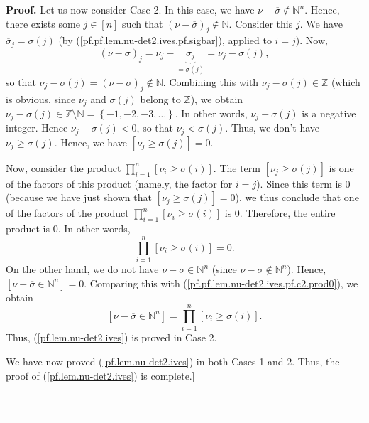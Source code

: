 \documentclass
[numbers=enddot,12pt,final,onecolumn,notitlepage,english]{scrartcl}%
\theoremstyle{definition}
\newenvironment{proof}[1][Proof]{\noindent\textbf{#1.} }{\ \rule{0.5em}{0.5em}}
\let\prodnonlimits\prod
\renewcommand{\prod}{\prodnonlimits\limits}
\newenvironment{verlong}{}{}
\begin{document}
\begin{verlong}
\begin{proof}
Let us now consider Case 2. In this case, we have $\nu-\overline{\sigma}%
\notin\mathbb{N}^{n}$. Hence, there exists some $j\in\left[  n\right]  $ such
that $\left(  \nu-\overline{\sigma}\right)  _{j}\notin\mathbb{N}$. Consider
this $j$. We have $\overline{\sigma}_{j}=\sigma\left(  j\right)  $ (by
(\ref{pf.pf.lem.nu-det2.ives.pf.sigbar}), applied to $i=j$). Now,
\[
\left(  \nu-\overline{\sigma}\right)  _{j}=\nu_{j}-\underbrace{\overline
{\sigma}_{j}}_{=\sigma\left(  j\right)  }=\nu_{j}-\sigma\left(  j\right)  ,
\]
so that $\nu_{j}-\sigma\left(  j\right)  =\left(  \nu-\overline{\sigma
}\right)  _{j}\notin\mathbb{N}$. Combining this with $\nu_{j}-\sigma\left(
j\right)  \in\mathbb{Z}$ (which is obvious, since $\nu_{j}$ and $\sigma\left(
j\right)  $ belong to $\mathbb{Z}$), we obtain $\nu_{j}-\sigma\left(
j\right)  \in\mathbb{Z}\setminus\mathbb{N}=\left\{  -1,-2,-3,\ldots\right\}
$. In other words, $\nu_{j}-\sigma\left(  j\right)  $ is a negative integer.
Hence $\nu_{j}-\sigma\left(  j\right)  <0$, so that $\nu_{j}<\sigma\left(
j\right)  $. Thus, we don't have $\nu_{j}\geq\sigma\left(  j\right)  $. Hence,
we have $\left[  \nu_{j}\geq\sigma\left(  j\right)  \right]  =0$.

Now, consider the product $\prod_{i=1}^{n}\left[  \nu_{i}\geq\sigma\left(
i\right)  \right]  $. The term $\left[  \nu_{j}\geq\sigma\left(  j\right)
\right]  $ is one of the factors of this product (namely, the factor for
$i=j$). Since this term is $0$ (because we have just shown that $\left[
\nu_{j}\geq\sigma\left(  j\right)  \right]  =0$), we thus conclude that one of
the factors of the product $\prod_{i=1}^{n}\left[  \nu_{i}\geq\sigma\left(
i\right)  \right]  $ is $0$. Therefore, the entire product is $0$. In other
words,
\begin{equation}
\prod_{i=1}^{n}\left[  \nu_{i}\geq\sigma\left(  i\right)  \right]  =0.
\label{pf.pf.lem.nu-det2.ives.pf.c2.prod0}%
\end{equation}
On the other hand, we do not have $\nu-\overline{\sigma}\in\mathbb{N}^{n}$
(since $\nu-\overline{\sigma}\notin\mathbb{N}^{n}$). Hence, $\left[
\nu-\overline{\sigma}\in\mathbb{N}^{n}\right]  =0$. Comparing this with
(\ref{pf.pf.lem.nu-det2.ives.pf.c2.prod0}), we obtain%
\[
\left[  \nu-\overline{\sigma}\in\mathbb{N}^{n}\right]  =\prod_{i=1}^{n}\left[
\nu_{i}\geq\sigma\left(  i\right)  \right]  .
\]
Thus, (\ref{pf.lem.nu-det2.ives}) is proved in Case 2. \medskip

We have now proved (\ref{pf.lem.nu-det2.ives}) in both Cases 1 and 2. Thus,
the proof of (\ref{pf.lem.nu-det2.ives}) is complete.] \medskip


\end{proof}
\end{verlong}
\end{document}
